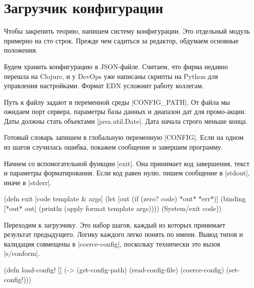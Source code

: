 \section{Загрузчик конфигурации}


Чтобы закрепить теорию, напишем систему конфигурации. Это отдельный модуль
примерно на сто строк. Прежде чем садиться за редактор, обдумаем основные
положения.

Будем хранить конфигурацию в JSON-файле. Считаем, что фирма недавно перешла на
Clojure, и у DevOps уже написаны скрипты на Python для управления
настройками. Формат EDN усложнит работу коллегам.


Путь к файлу задают в переменной среды \spverb|CONFIG_PATH|. От файла мы ожидаем
порт сервера, параметры базы данных и диапазон дат для промо-акции. Даты должны
стать объектами \spverb|java.util.Date|. Дата начала строго меньше конца.

Готовый словарь запишем в глобальную переменную \spverb|CONFIG|. Если на одном
из шагов случилась ошибка, покажем сообщение и завершим программу.

Начнем со вспомогательной функции \spverb|exit|. Она принимает код завершения,
текст и параметры форматирования. Если код равен нулю, пишем сообщение в
\spverb|stdout|, иначе в \spverb|stderr|.


\begin{english}
  \begin{clojure}
(defn exit
  [code template & args]
  (let [out (if (zero? code) *out* *err*)]
    (binding [*out* out]
      (println (apply format template args))))
  (System/exit code))
  \end{clojure}
\end{english}

Переходим к загрузчику. Это набор шагов, каждый из которых принимает результат
предыдущего. Логику каждого легко понять по имени. Вывод типов и валидация
совмещены в \spverb|coerce-config|, поскольку технически это вызов
\spverb|s/conform|.


\begin{english}
  \begin{clojure}
(defn load-config! []
  (-> (get-config-path)
      (read-config-file)
      (coerce-config)
      (set-config!)))
  \end{clojure}
\end{english}

